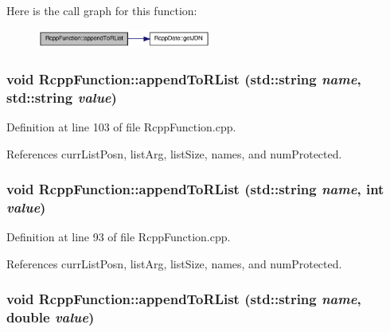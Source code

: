 Here is the call graph for this function:\nopagebreak
\begin{figure}[H]
\begin{center}
\leavevmode
\includegraphics[width=162pt]{classRcppFunction_a9aab0b3accb81d90fb813acf3bf4c49d_cgraph}
\end{center}
\end{figure}
\hypertarget{classRcppFunction_a861ba7ae5c09acf31a034472b5a47728}{
\subsubsection[{appendToRList}]{\setlength{\rightskip}{0pt plus 5cm}void RcppFunction::appendToRList (std::string {\em name}, \/  std::string {\em value})}}
\label{classRcppFunction_a861ba7ae5c09acf31a034472b5a47728}


Definition at line 103 of file RcppFunction.cpp.

References currListPosn, listArg, listSize, names, and numProtected.\hypertarget{classRcppFunction_afce449ac5d89b32e0e0b9f584278a672}{
\subsubsection[{appendToRList}]{\setlength{\rightskip}{0pt plus 5cm}void RcppFunction::appendToRList (std::string {\em name}, \/  int {\em value})}}
\label{classRcppFunction_afce449ac5d89b32e0e0b9f584278a672}


Definition at line 93 of file RcppFunction.cpp.

References currListPosn, listArg, listSize, names, and numProtected.\hypertarget{classRcppFunction_a0df1a8ff093e21a2a7c6fc80d6645c7e}{
\subsubsection[{appendToRList}]{\setlength{\rightskip}{0pt plus 5cm}void RcppFunction::appendToRList (std::string {\em name}, \/  double {\em value})}}
\label{classRcppFunction_a0df1a8ff093e21a2a7c6fc80d6645c7e}


